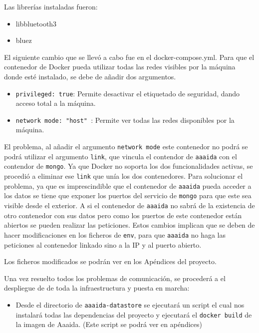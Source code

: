 Las librerías instaladas fueron:
 
\begin{itemize}
\item libbluetooth3
\item bluez
\end{itemize}

El siguiente cambio que se llevó a cabo fue en el docker-compose.yml. Para que el contenedor de Docker pueda utilizar todas las redes visibles por la máquina donde esté instalado, se debe de añadir dos argumentos.

\begin{itemize}
\item \texttt{privileged: true}: Permite desactivar el etiquetado de seguridad, dando acceso total a la máquina. 
\item \texttt{network mode: "host" }: Permite ver todas las redes disponibles por la máquina. 
\end{itemize}

El problema, al añadir el argumento \texttt{network mode} este contenedor no podrá se podrá utilizar el argumento \texttt{link}, que vincula el contendor de \texttt{aaaida} con el contendor de \texttt{mongo}.  Ya que Docker no soporta los dos funcionalidades activas, se procedió a eliminar ese \texttt{link} que unía los dos contenedores. Para solucionar el problema, ya que es imprescindible que el contenedor de \texttt{aaaida} pueda acceder a los datos se tiene que exponer los puertos del servicio de \texttt{mongo} para que este sea visible desde el exterior. A si el contenedor de \texttt{aaaida} no sabrá de la existencia de otro contenedor con sus datos pero como los puertos de este contenedor están abiertos se pueden realizar las peticiones. Estos cambios implican que se deben de hacer modificaciones en los ficheros de \texttt{env}, para que \texttt{aaaida} no haga las peticiones al contenedor linkado sino a la IP y al puerto abierto.

Los ficheros modificados se podrán ver en los Apéndices del proyecto. 

Una vez resuelto todos los problemas de comunicación, se procederá a el despliegue de de toda la infraestructura y puesta en marcha:

\begin{itemize}
\item Desde el directorio de \texttt{aaaida-datastore} se ejecutará un script el cual nos instalará todas las dependencias del proyecto y ejecutará el  \texttt{docker build} de la imagen de Aaaida. (Este script se podrá ver en apéndices) 
\end{itemize}
\pagebreak

